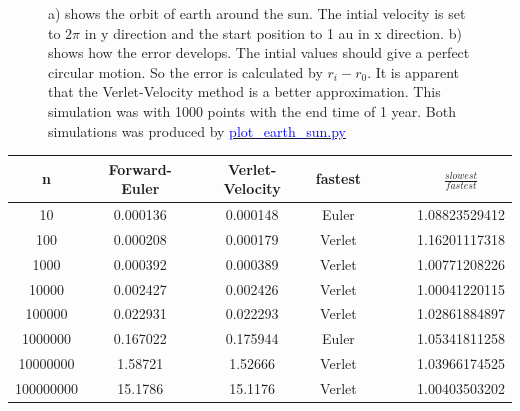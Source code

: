 \begin{figure}[H]
\begin{subfigure}{0.5\textwidth}
        \caption{}
    \end{subfigure}
    \caption{a) shows the orbit of earth around the sun. The intial velocity is set to $2\pi$ in y direction and the start position to 1 au in x direction. b) shows how the error develops. The intial values should give a perfect circular motion. So the error is calculated by $r_i - r_{0}$. It is apparent that the Verlet-Velocity method is a better approximation. This simulation was with 1000 points with the end time of 1 year. Both simulations was produced by \href{https://github.com/erikfsk/Project-3/tree/master/Project3/earth-sun-standard-results}{\textcolor{blue}{plot\_earth\_sun.py}}}
    \label{fig:earth-sun}
\end{figure}


\begin{center}
\label{table:euler-verlet-time}
\begin{tabularx}{\textwidth}{c c c c c c c c}
    \hline 
    \hline 
    n & Forward-Euler & Verlet-Velocity &  fastest &&&& $\frac{slowest}{fastest}$\\ 
    \hline
    10 & 0.000136 & 0.000148 & Euler &&&&   1.08823529412   \\ 
    100 & 0.000208 & 0.000179 & Verlet &&&&   1.16201117318   \\ 
    1000 & 0.000392 & 0.000389 & Verlet &&&&  1.00771208226   \\ 
    10000 & 0.002427 & 0.002426 & Verlet &&&&   1.00041220115  \\ 
    100000 & 0.022931 & 0.022293 & Verlet &&&&   1.02861884897   \\ 
    1000000 & 0.167022 & 0.175944 & Euler &&&&   1.05341811258  \\ 
    10000000 & 1.58721 & 1.52666 & Verlet &&&&   1.03966174525  \\ 
    100000000 & 15.1786 & 15.1176 & Verlet &&&&   1.00403503202  \\ 
    \hline
\end{tabularx}
\end{center}














